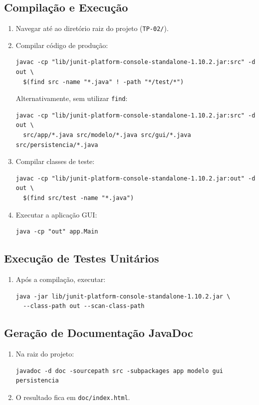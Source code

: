 \documentclass[a4paper,12pt]{article}
\begin{document}
\subsection{Compilação e Execução}
\begin{enumerate}
    \item Navegar até ao diretório raiz do projeto (\texttt{TP-02/}).
    \item Compilar código de produção:
\begin{verbatim}
javac -cp "lib/junit-platform-console-standalone-1.10.2.jar:src" -d out \
  $(find src -name "*.java" ! -path "*/test/*")
\end{verbatim}
    Alternativamente, sem utilizar \texttt{find}:
\begin{verbatim}
javac -cp "lib/junit-platform-console-standalone-1.10.2.jar:src" -d out \
  src/app/*.java src/modelo/*.java src/gui/*.java src/persistencia/*.java
\end{verbatim}
    \item Compilar classes de teste:
\begin{verbatim}
javac -cp "lib/junit-platform-console-standalone-1.10.2.jar:out" -d out \
  $(find src/test -name "*.java")
\end{verbatim}
    \item Executar a aplicação GUI:
\begin{verbatim}
java -cp "out" app.Main
\end{verbatim}
\end{enumerate}

\subsection{Execução de Testes Unitários}
\begin{enumerate}
    \item Após a compilação, executar:
\begin{verbatim}
java -jar lib/junit-platform-console-standalone-1.10.2.jar \
  --class-path out --scan-class-path
\end{verbatim}
\end{enumerate}

\subsection{Geração de Documentação JavaDoc}
\begin{enumerate}
    \item Na raiz do projeto:
\begin{verbatim}
javadoc -d doc -sourcepath src -subpackages app modelo gui persistencia
\end{verbatim}
    \item O resultado fica em \texttt{doc/index.html}.
\end{enumerate}
\end{document}
